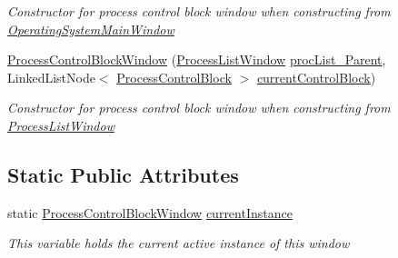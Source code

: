 \begin{DoxyCompactItemize}
\begin{DoxyCompactList}\small\item\em Constructor for process control block window when constructing from \hyperlink{class_c_p_u___o_s___simulator_1_1_operating_system_main_window}{Operating\+System\+Main\+Window} \end{DoxyCompactList}\item 
\hyperlink{class_c_p_u___o_s___simulator_1_1_process_control_block_window_ac58527201e0de5a8dab1d90a45a18b20}{Process\+Control\+Block\+Window} (\hyperlink{class_c_p_u___o_s___simulator_1_1_process_list_window}{Process\+List\+Window} \hyperlink{class_c_p_u___o_s___simulator_1_1_process_control_block_window_a63c162f28cabcf42add4094087a10e68}{proc\+List\+\_\+\+Parent}, Linked\+List\+Node$<$ \hyperlink{class_c_p_u___o_s___simulator_1_1_operating___system_1_1_process_control_block}{Process\+Control\+Block} $>$ \hyperlink{class_c_p_u___o_s___simulator_1_1_process_control_block_window_a6019633d26586b0df1c4c2d6f008f6c9}{current\+Control\+Block})
\begin{DoxyCompactList}\small\item\em Constructor for process control block window when constructing from \hyperlink{class_c_p_u___o_s___simulator_1_1_process_list_window}{Process\+List\+Window} \end{DoxyCompactList}\end{DoxyCompactItemize}
\subsection*{Static Public Attributes}
\begin{DoxyCompactItemize}
\item 
static \hyperlink{class_c_p_u___o_s___simulator_1_1_process_control_block_window}{Process\+Control\+Block\+Window} \hyperlink{class_c_p_u___o_s___simulator_1_1_process_control_block_window_a88bea947f074426da083add43be70d48}{current\+Instance}
\begin{DoxyCompactList}\small\item\em This variable holds the current active instance of this window \end{DoxyCompactList}\end{DoxyCompactItemize}
